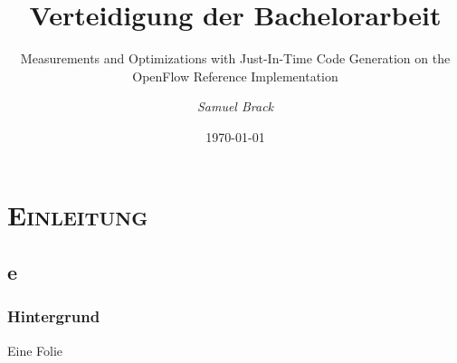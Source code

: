 \documentclass[xcolor=x11names,compress]{beamer}
\renewcommand{\(}{\begin{columns}}
\renewcommand{\)}{\end{columns}}
\newcommand{\<}[1]{\begin{column}{#1}}
\renewcommand{\>}{\end{column}}
\begin{document}
\begin{frame}
\title{\textbf{Verteidigung der Bachelorarbeit}}
\subtitle{Measurements and Optimizations with Just-In-Time Code Generation on the OpenFlow Reference Implementation}

\author{
  \vspace*{-1cm}
	{\it Samuel Brack}\\
}
\date{\today}
\titlepage
\end{frame}


\section{\scshape Einleitung}
\subsection{e}
\begin{frame}
  \frametitle{Hintergrund}
  Eine Folie
\end{frame}
\end{document}
